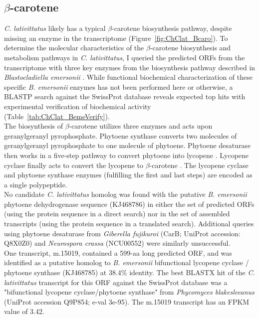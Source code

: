 \subsection*{$\beta$-carotene} 
\textit{C. lativittatus} likely has a typical $\beta$-carotene biosynthesis pathway, despite missing an enzyme in the transcriptome (Figure~\ref{fig:ChClat_Bcaro}). To determine the molecular characteristics of the $\beta$-carotene biosynthesis and metabolism pathways in \textit{C. lativittatus}, I queried the predicted ORFs from the transcriptome with three key enzymes from the biosynthesis pathway described in \textit{Blastocladiella emersonii} \cite{Avelar2014}. While functional biochemical characterization of these specific \textit{B. emersonii} enzymes has not been performed here or otherwise, a BLASTP search against the SwissProt database reveals expected top hits with experimental verification of biochemical activity (Table~\ref{tab:ChClat_BemeVerify}). \\
\indent The biosynthesis of $\beta$-carotene utilizes three enzymes and acts upon geranylgeranyl pyrophosphate. Phytoene synthase converts two molecules of geranylgeranyl pyrophosphate to one molecule of phytoene. Phytoene desaturase then works in a five-step pathway to convert phytoene into lycopene \cite{Hausmann2000}. Lycopene cyclase finally acts to convert the lycopene to $\beta$-carotene \cite{Cunningham1994}. The lycopene cyclase and phytoene synthase enzymes (fulfilling the first and last steps) are encoded as a single polypeptide.\\
\indent No candidate \textit{C. lativittatus} homolog was found with the putative \textit{B. emersonii} phytoene dehydrogenase sequence (KJ468786) in either the set of predicted ORFs (using the protein sequence in a direct search) nor in the set of assembled transcripts (using the protein sequence in a translated search). Additional queries using phytoene desaturase from \textit{Giberella fujikuroi} (CarB; UniProt accession: Q8X0Z0) and \textit{Neurospora crassa} (NCU00552) were similarly unsuccessful. \\
\indent One transcript, m.15019, contained a 599-aa long predicted ORF, and was identified as a putative homolog to \textit{B. emersonii} bifunctional lycopene cyclase / phytoene synthase (KJ468785) at 38.4\% identity. The best BLASTX hit of the \textit{C. lativittatus} transcript for this ORF against the SwissProt database was a "bifunctional lycopene cyclase/phytoene synthase" from\textit{ Phycomyces blakesleeanus} (UniProt accession Q9P854; e-val 3e-95). The m.15019 transcript has an FPKM value of 3.42. \\
